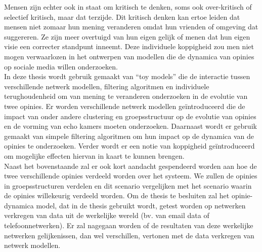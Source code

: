 \documentclass[11 pt , letterpaper , twoside , openright]{book}
\newenvironment{abstract}%
{\cleardoublepage\null \vfill\begin{center}\bfseries \abstractname \end{center}}{\vfill\null}
\begin{document}
\begin{abstract}
\newline
Mensen zijn echter ook in staat om kritisch te denken, soms ook over-kritisch of selectief kritisch, maar dat terzijde. Dit kritisch denken kan ertoe leiden dat mensen niet zomaar hun mening veranderen omdat hun vrienden of omgeving dat suggereren. Ze zijn meer overtuigd van hun eigen gelijk of menen dat hun eigen visie een correcter standpunt inneemt. Deze individuele koppigheid zou men niet mogen verwaarlozen in het ontwerpen van modellen die de dynamica van opinies op sociale media willen onderzoeken.\\
\newline
In deze thesis wordt gebruik gemaakt van ``toy models'' die de interactie tussen verschillende netwerk modellen, filtering algoritmen en individuele terughoudenheid om van mening te veranderen onderzoeken in de evolutie van twee opinies. Er worden verschillende netwerk modellen geïntroduceerd die de impact van onder andere clustering en groepsstructuur op de evolutie van opinies en de vorming van echo kamers moeten onderzoeken. Daarnaast wordt er gebruik gemaakt van simpele filtering algoritmen om hun impact op de dynamica van de opinies te onderzoeken. Verder wordt er een notie van koppigheid geïntroduceerd om mogelijke effecten hiervan in kaart te kunnen brengen. \\
\newline
Naast het bovenstaande zal er ook kort aandacht gespendeerd worden aan hoe de twee verschillende opinies verdeeld worden over het systeem. We zullen de opinies in groepsstructuren verdelen en dit scenario vergelijken met het scenario waarin de opinies willekeurig verdeeld worden. Om de thesis te besluiten zal het opinie-dynamica model, dat in de thesis gebruikt wordt, getest worden op netwerken verkregen van data uit de werkelijke wereld (bv. van email data of telefoonnetwerken). Er zal nagegaan worden of de resultaten van deze werkelijke netwerken gelijkenissen, dan wel verschillen, vertonen met de data verkregen van netwerk modellen.
\setcounter{abstractpage}{\value{page}}
\end{abstract}

\setcounter{page}{\value{abstractpage}}

\tableofcontents
{}
\listoffigures
{}
\listoftables
{}
\end{document}
